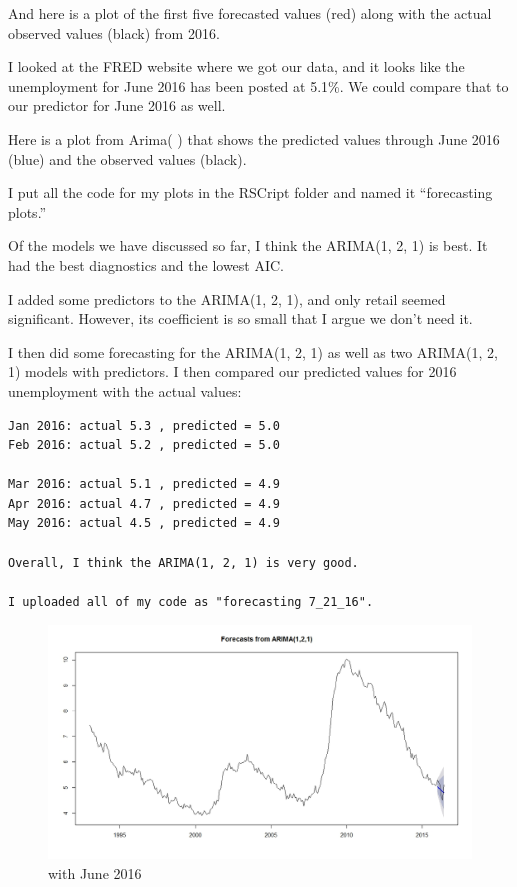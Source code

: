 \documentclass[twoside,twocolumn]{article}
\begin{document}
 And here is a plot of the first five forecasted values (red) along with the actual observed values (black) from 2016. 
 
 I looked at the FRED website where we got our data, and it looks like the unemployment for June 2016 has been posted at 5.1\%. We could compare that to our predictor for June 2016 as well.

Here is a plot from Arima( ) that shows the predicted values through June 2016 (blue) and the observed values (black).

I put all the code for my plots in the RSCript folder and named it ``forecasting plots.''


Of the models we have discussed so far, I think the ARIMA(1, 2, 1) is best. It had the best diagnostics and the lowest AIC.

I added some predictors to the ARIMA(1, 2, 1), and only retail seemed significant. However, its coefficient is so small that I argue we don't need it.

I then did some forecasting for the ARIMA(1, 2, 1) as well as two ARIMA(1, 2, 1) models with predictors. I then compared our predicted values for 2016 unemployment with the actual values:

\begin{verbatim}
Jan 2016: actual 5.3 , predicted = 5.0
Feb 2016: actual 5.2 , predicted = 5.0

Mar 2016: actual 5.1 , predicted = 4.9
Apr 2016: actual 4.7 , predicted = 4.9
May 2016: actual 4.5 , predicted = 4.9

Overall, I think the ARIMA(1, 2, 1) is very good.

I uploaded all of my code as "forecasting 7_21_16".

\end{verbatim}

  \begin{figure}[htb]
    	\centering
     	\caption{with June 2016}
     	\includegraphics[width=\linewidth]{images/forejune}
 \end{figure}
 
\end{document}
